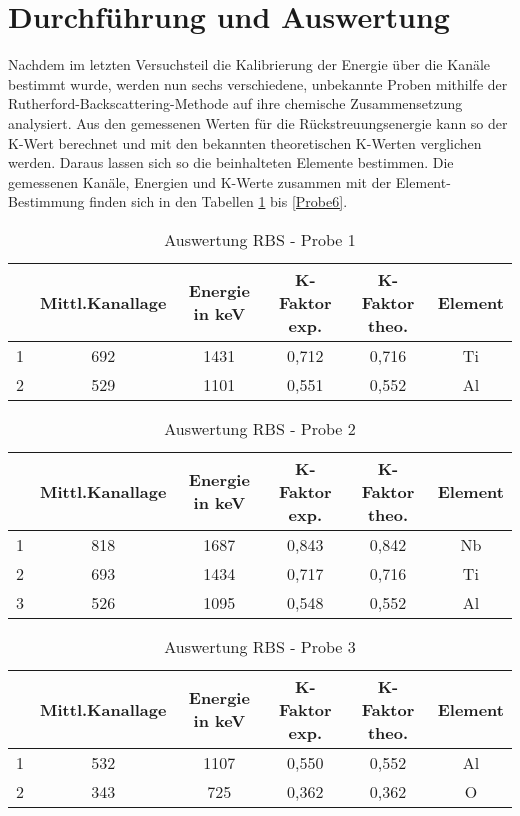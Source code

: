 \section{Durchführung und Auswertung}
Nachdem im letzten Versuchsteil die Kalibrierung der Energie über die Kanäle bestimmt wurde, werden nun sechs verschiedene, unbekannte Proben mithilfe der Rutherford-Backscattering-Methode auf ihre chemische Zusammensetzung analysiert. Aus den gemessenen Werten für die Rückstreuungsenergie kann so der K-Wert berechnet und mit den bekannten theoretischen K-Werten verglichen werden. Daraus lassen sich so die beinhalteten Elemente bestimmen. Die gemessenen Kanäle, Energien und K-Werte zusammen mit der Element-Bestimmung finden sich in den Tabellen \ref{Probe1} bis \ref{Probe6}. 

\begin{table}[h]
	\caption{Auswertung RBS - Probe 1}
	\begin{tabular}{|c|c|c|c|c|c|}
	\hline
	 & Mittl.Kanallage & Energie in keV & K-Faktor exp. & K-Faktor theo. & Element \\ \hline
	   1 & 692 & 1431 & 0,712 & 0,716 & Ti\\ \hline
	   2 & 529 & 1101 & 0,551 & 0,552 & Al \\ \hline
	\end{tabular}
\label{Probe1}
\end{table}

\begin{table}[h]
	\caption{Auswertung RBS - Probe 2}
	\begin{tabular}{|c|c|c|c|c|c|}
	\hline
	 & Mittl.Kanallage & Energie in keV & K-Faktor exp. & K-Faktor theo. & Element \\ \hline
	   1 & 818 & 1687 & 0,843 & 0,842 & Nb\\ \hline
	   2 & 693 & 1434 & 0,717 & 0,716 & Ti \\ \hline
	   3 & 526 & 1095 & 0,548 & 0,552 & Al \\ \hline
	\end{tabular}
\label{Probe2}
\end{table}

\begin{table}[h]
	\caption{Auswertung RBS - Probe 3}
	\begin{tabular}{|c|c|c|c|c|c|}
	\hline
	 & Mittl.Kanallage & Energie in keV & K-Faktor exp. & K-Faktor theo. & Element \\ \hline
	   1 & 532 & 1107 & 0,550 & 0,552 & Al\\ \hline
	   2 & 343 & 725 & 0,362 & 0,362 & O \\ \hline
	\end{tabular}
\label{Probe3}
\end{table}

